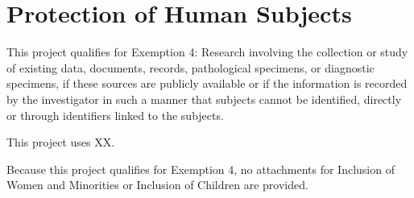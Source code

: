 \documentclass[11pt]{article}
\begin{document}
\section*{Protection of Human Subjects}

This project qualifies for Exemption 4: Research involving the collection or study of existing data, documents, records, pathological specimens, or diagnostic specimens, if these sources are publicly  available or if the information is recorded by the investigator in such a manner that subjects cannot be identified, directly or through identifiers linked to the subjects.

This project uses XX. 

Because this project qualifies for Exemption 4, no attachments for Inclusion of Women and Minorities or Inclusion of Children are provided.
\end{document}
